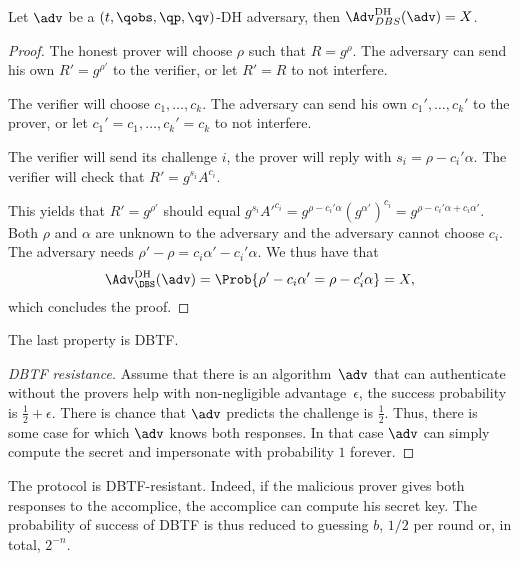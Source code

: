 \begin{theorem}
  Let \(\adv\) be a \((t, \qobs, \qp, \qv)\)-DH adversary, then 
  \(\Adv_{DBS}^{\text{DH}}(\adv) = X\).
\end{theorem}

\begin{proof}
  The honest prover will choose \(\rho\) such that \(R = g^\rho\).
  The adversary can send his own \(R' = g^{\rho'}\) to the verifier, or let 
  \(R' = R\) to not interfere.

  The verifier will choose \(c_1, \dotsc, c_k\).
  The adversary can send his own \(c_1', \dotsc, c_k'\) to the prover, or let 
  \(c_1' = c_1, \dotsc, c_k' = c_k\) to not interfere.

  The verifier will send its challenge \(i\), the prover will reply with \(s_i 
    = \rho - c_i' \alpha\).
  The verifier will check that \(R' = g^{s_i} A^{c_i}\).

  This yields that \(R' = g^{\rho'}\) should equal \(g^{s_i} A'^{c_i} = g^{\rho 
      - c_i' \alpha} (g^{\alpha'})^{c_i} = g^{\rho - c_i' \alpha + c_i 
      \alpha'}\).
  Both \(\rho\) and \(\alpha\) are unknown to the adversary and the adversary 
  cannot choose \(c_i\).
  The adversary needs \(\rho' - \rho = c_i \alpha' - c_i' \alpha\).
  We thus have that \[\Adv_{\DBS}^{\text{DH}}(\adv) = \Prob{\rho' - c_i \alpha' 
      = \rho - c_i' \alpha} = X,\]
  which concludes the proof.
\end{proof}

The last property is \ac{DBTF}.

\begin{proof}[\acs*{DBTF} resistance]
  Assume that there is an algorithm~\(\adv\) that can authenticate without the 
  provers help with non-negligible advantage~\(\epsilon\), \ie the success 
  probability is \(\frac{1}{2}+\epsilon\).
  There is chance that \(\adv\) predicts the challenge is \(\frac{1}{2}\).
  Thus, there is some case for which \(\adv\) knows both responses.
  In that case \(\adv\) can simply compute the secret and impersonate with 
  probability \(1\) forever.
\end{proof}

The protocol is \ac{DBTF}-resistant.
Indeed, if the malicious prover gives both responses to the accomplice, the 
accomplice can compute his secret key.
The probability of success of \ac{DBTF} is thus reduced to guessing \(b\), \ie \(1/2\) per round or, in total, \(2^{-n}\).

